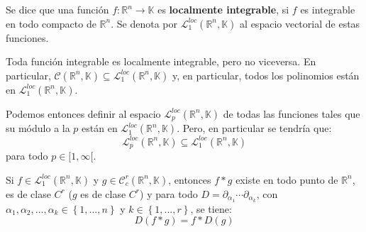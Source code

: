 \documentclass[12pt]{report}
\theoremstyle{largebreak}
\newcommand\cf[3]{\ensuremath{#1:#2\rightarrow#3}}
\begin{document}
    \begin{mydef}
        Se dice que una función $\cf{f}{\mathbb{R}^n}{\mathbb{K}}$ es \textbf{localmente integrable}, si $f$ es integrable en todo compacto de $\mathbb{R}^n$. Se denota por $\mathcal{L}_1^{loc}(\mathbb{R}^n,\mathbb{K})$ al espacio vectorial de estas funciones.
    \end{mydef}

    \begin{obs}
        Toda función integrable es localmente integrable, pero no viceversa. En particular, $\mathcal{C}(\mathbb{R}^n,\mathbb{K})\subseteq\mathcal{L}_1^{loc}(\mathbb{R}^n,\mathbb{K})$ y, en particular, todos los polinomios están en $\mathcal{L}_1^{loc}(\mathbb{R}^n,\mathbb{K})$.

        Podemos entonces definir al espacio $\mathcal{L}_p^{loc}(\mathbb{R}^n,\mathbb{K})$ de todas las funciones tales que su módulo a la $p$ están en $\mathcal{L}_1^{loc}(\mathbb{R}^n,\mathbb{K})$. Pero, en particular se tendría que:
        \begin{equation*}
            \mathcal{L}_p^{loc}(\mathbb{R}^n,\mathbb{K})\subseteq\mathcal{L}_1^{loc}(\mathbb{R}^n,\mathbb{K})
        \end{equation*}
        para todo $p\in[1,\infty[$.
    \end{obs}

    \begin{propo}
        Si $f\in\mathcal{L}_1^{loc}(\mathbb{R}^n,\mathbb{K})$ y $g\in\mathcal{C}_c^r(\mathbb{R}^n,\mathbb{K})$, entonces $f*g$ existe en todo punto de $\mathbb{R}^n$, es de clase $C^r$ ($g$ es de clase $C^r$) y para todo $D=\partial_{\alpha_1}\cdots\partial_{\alpha_k}$, con $\alpha_1,\alpha_2,...,\alpha_k\in\left\{1,...,n \right\}$ y $k\in\left\{1,...,r \right\}$, se tiene:
        \begin{equation*}
            D(f*g)=f*D(g)
        \end{equation*}
    \end{propo}
\end{document}
